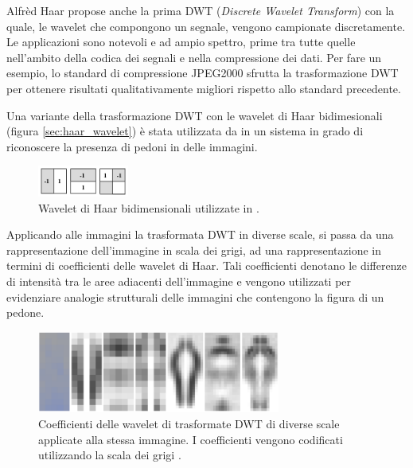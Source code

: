 Alfrèd Haar propose anche la prima DWT (\emph{Discrete Wavelet Transform}) con la quale, le wavelet che compongono un segnale, vengono campionate discretamente.
Le applicazioni sono notevoli e ad ampio spettro, prime tra tutte quelle nell'ambito della codica dei segnali e nella compressione dei dati. Per fare un esempio, lo standard di compressione JPEG2000 sfrutta la trasformazione DWT \cite{Jpeg2000} per ottenere risultati qualitativamente migliori rispetto allo standard precedente.

Una variante della trasformazione DWT con le wavelet di Haar bidimesionali (figura \ref{sec:haar_wavelet}) è stata utilizzata da \citet{Oren97} in un sistema in grado di riconoscere la presenza di pedoni in delle immagini.

\begin{figure}
    \begin{center}
        \includegraphics[width=3cm]{img/haar_wavelet.png}
    \end{center}
    \caption{Wavelet di Haar bidimensionali utilizzate in \cite{Oren97}.}
    \label{fig:haar_wavelet}
\end{figure}

Applicando alle immagini la trasformata DWT in diverse scale, si passa da una rappresentazione dell'immagine in scala dei grigi, ad una rappresentazione in termini di coefficienti delle wavelet di Haar.
Tali coefficienti denotano le differenze di intensità tra le aree adiacenti dell'immagine e vengono utilizzati per evidenziare analogie strutturali delle immagini che contengono la figura di un pedone.

\begin{figure}
    \begin{center}
        \includegraphics[width=8cm]{img/pedestrian_dwt.png}
    \end{center}
    \caption{Coefficienti delle wavelet di trasformate DWT di diverse scale applicate alla stessa immagine. I coefficienti vengono codificati utilizzando la scala dei grigi \cite[Figura 3]{Oren97}.}
    \label{fig:non_standard_dwt}
\end{figure}

